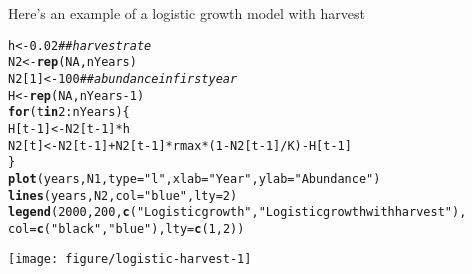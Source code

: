 \documentclass[12pt]{article}\usepackage[]{graphicx}\usepackage[]{color}
\makeatletter
\newcommand{\hlnum}[1]{\textcolor[rgb]{0.686,0.059,0.569}{#1}}%
\newcommand{\hlstr}[1]{\textcolor[rgb]{0.192,0.494,0.8}{#1}}%
\newcommand{\hlcom}[1]{\textcolor[rgb]{0.678,0.584,0.686}{\textit{#1}}}%
\newcommand{\hlopt}[1]{\textcolor[rgb]{0,0,0}{#1}}%
\newcommand{\hlstd}[1]{\textcolor[rgb]{0.345,0.345,0.345}{#1}}%
\newcommand{\hlkwa}[1]{\textcolor[rgb]{0.161,0.373,0.58}{\textbf{#1}}}%
\newcommand{\hlkwb}[1]{\textcolor[rgb]{0.69,0.353,0.396}{#1}}%
\newcommand{\hlkwc}[1]{\textcolor[rgb]{0.333,0.667,0.333}{#1}}%
\newcommand{\hlkwd}[1]{\textcolor[rgb]{0.737,0.353,0.396}{\textbf{#1}}}%
\newenvironment{kframe}{%
 \def\at@end@of@kframe{}%
 \ifinner\ifhmode%
  \def\at@end@of@kframe{\end{minipage}}%
  \begin{minipage}{\columnwidth}%
 \fi\fi%
 \def\FrameCommand##1{\hskip\@totalleftmargin \hskip-\fboxsep
 \colorbox{shadecolor}{##1}\hskip-\fboxsep
     \hskip-\linewidth \hskip-\@totalleftmargin \hskip\columnwidth}%
 \MakeFramed {\advance\hsize-\width
   \@totalleftmargin\z@ \linewidth\hsize
   \@setminipage}}%
 {\par\unskip\endMakeFramed%
 \at@end@of@kframe}
\newenvironment{knitrout}{}{} %
\makeatother
\begin{document}
Here's an example of a logistic growth model with harvest
\begin{knitrout}\small
{}\color{fgcolor}\begin{kframe}
\begin{alltt}
\hlstd{h} \hlkwb{<-} \hlnum{0.02}                \hlcom{## harvest rate}
\hlstd{N2} \hlkwb{<-} \hlkwd{rep}\hlstd{(}\hlnum{NA}\hlstd{, nYears)}
\hlstd{N2[}\hlnum{1}\hlstd{]} \hlkwb{<-} \hlnum{100}             \hlcom{## abundance in first year}
\hlstd{H} \hlkwb{<-} \hlkwd{rep}\hlstd{(}\hlnum{NA}\hlstd{, nYears}\hlopt{-}\hlnum{1}\hlstd{)}
\hlkwa{for}\hlstd{(t} \hlkwa{in} \hlnum{2}\hlopt{:}\hlstd{nYears) \{}
    \hlstd{H[t}\hlopt{-}\hlnum{1}\hlstd{]} \hlkwb{<-} \hlstd{N2[t}\hlopt{-}\hlnum{1}\hlstd{]}\hlopt{*}\hlstd{h}
    \hlstd{N2[t]} \hlkwb{<-} \hlstd{N2[t}\hlopt{-}\hlnum{1}\hlstd{]} \hlopt{+} \hlstd{N2[t}\hlopt{-}\hlnum{1}\hlstd{]}\hlopt{*}\hlstd{rmax}\hlopt{*}\hlstd{(}\hlnum{1} \hlopt{-} \hlstd{N2[t}\hlopt{-}\hlnum{1}\hlstd{]}\hlopt{/}\hlstd{K)} \hlopt{-} \hlstd{H[t}\hlopt{-}\hlnum{1}\hlstd{]}
\hlstd{\}}
\hlkwd{plot}\hlstd{(years, N1,} \hlkwc{type}\hlstd{=}\hlstr{"l"}\hlstd{,} \hlkwc{xlab}\hlstd{=}\hlstr{"Year"}\hlstd{,} \hlkwc{ylab}\hlstd{=}\hlstr{"Abundance"}\hlstd{)}
\hlkwd{lines}\hlstd{(years, N2,} \hlkwc{col}\hlstd{=}\hlstr{"blue"}\hlstd{,} \hlkwc{lty}\hlstd{=}\hlnum{2}\hlstd{)}
\hlkwd{legend}\hlstd{(}\hlnum{2000}\hlstd{,} \hlnum{200}\hlstd{,} \hlkwd{c}\hlstd{(}\hlstr{"Logistic growth"}\hlstd{,} \hlstr{"Logistic growth with harvest"}\hlstd{),}
       \hlkwc{col}\hlstd{=}\hlkwd{c}\hlstd{(}\hlstr{"black"}\hlstd{,} \hlstr{"blue"}\hlstd{),} \hlkwc{lty}\hlstd{=}\hlkwd{c}\hlstd{(}\hlnum{1}\hlstd{,}\hlnum{2}\hlstd{))}
\end{alltt}
\end{kframe}

{\centering \texttt{[image: figure/logistic-harvest-1]} 

}


\end{knitrout}
\end{document}
